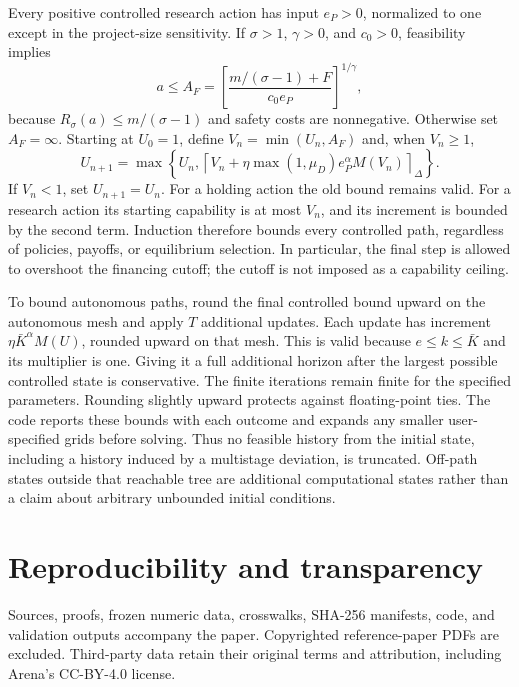 Every positive controlled research action has input $e_P>0$, normalized to one except in the project-size sensitivity. If $\sigma>1$, $\gamma>0$, and $c_0>0$, feasibility implies
\begin{equation}
 a\leq A_F=\left[\frac{m/(\sigma-1)+F}{c_0e_P}\right]^{1/\gamma},
\end{equation}
because $R_\sigma(a)\leq m/(\sigma-1)$ and safety costs are nonnegative. Otherwise set $A_F=\infty$. Starting at $U_0=1$, define $V_n=\min(U_n,A_F)$ and, when $V_n\geq1$,
\begin{equation}
 U_{n+1}=\max\left\{U_n,\left\lceil V_n+\eta\max(1,\mu_D)e_P^\alpha M(V_n)\right\rceil_\Delta\right\}.
\end{equation}
If $V_n<1$, set $U_{n+1}=U_n$. For a holding action the old bound remains valid. For a research action its starting capability is at most $V_n$, and its increment is bounded by the second term. Induction therefore bounds every controlled path, regardless of policies, payoffs, or equilibrium selection. In particular, the final step is allowed to overshoot the financing cutoff; the cutoff is not imposed as a capability ceiling.

To bound autonomous paths, round the final controlled bound upward on the autonomous mesh and apply $T$ additional updates. Each update has increment $\eta\bar K^\alpha M(U)$, rounded upward on that mesh. This is valid because $e\leq k\leq\bar K$ and its multiplier is one. Giving it a full additional horizon after the largest possible controlled state is conservative. The finite iterations remain finite for the specified parameters. Rounding slightly upward protects against floating-point ties. The code reports these bounds with each outcome and expands any smaller user-specified grids before solving. Thus no feasible history from the initial state, including a history induced by a multistage deviation, is truncated. Off-path states outside that reachable tree are additional computational states rather than a claim about arbitrary unbounded initial conditions.

\section{Reproducibility and transparency}
Sources, proofs, frozen numeric data, crosswalks, SHA-256 manifests, code, and validation outputs accompany the paper. Copyrighted reference-paper PDFs are excluded. Third-party data retain their original terms and attribution, including Arena's CC-BY-4.0 license.

